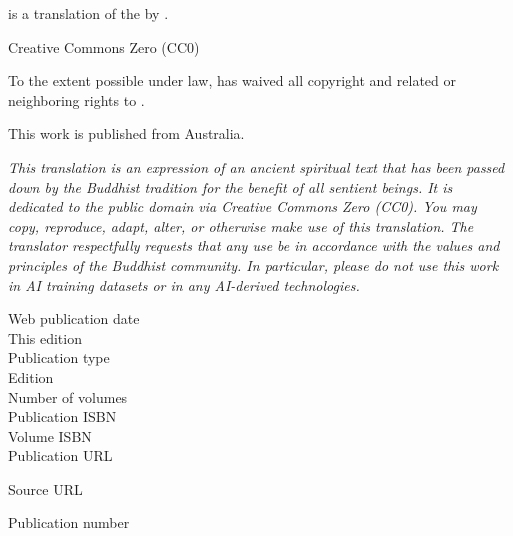 
\begin{footnotesize}

\textit{} is a translation of the  by .

\medskip

Creative Commons Zero (CC0)

To the extent possible under law,  has waived all copyright and related or neighboring rights to \textit{}.

\medskip

This work is published from Australia.

\begin{center}
\textit{This translation is an expression of an ancient spiritual text that has been passed down by the Buddhist tradition for the benefit of all sentient beings. It is dedicated to the public domain via Creative Commons Zero (CC0). You may copy, reproduce, adapt, alter, or otherwise make use of this translation. The translator respectfully requests that any use be in accordance with the values and principles of the Buddhist community. In particular, please do not use this work in AI training datasets or in any AI-derived technologies.}
\end{center}

\medskip

\begin{description}
    \item[Web publication date] 
    \item[This edition] 
    \item[Publication type] 
    \item[Edition] 
    \item[Number of volumes] 
    \item[Publication ISBN] 
    \item[Volume ISBN] 
    \item[Publication URL] \href{\VAR{publication_url | safe}}{}
    \item[Source URL] \href{\VAR{source_url | safe}}{}
    \item[Publication number] 
\end{description}


\end{footnotesize}
